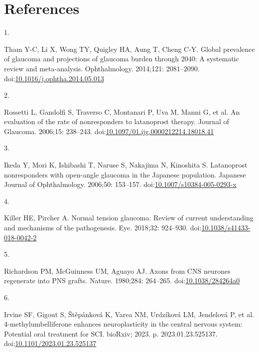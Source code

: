 \documentclass[
  12pt,
  a4paper,
]{book}
\newlength{\cslhangindent}
\newlength{\csllabelwidth}
\newlength{\cslentryspacingunit} %
\newenvironment{CSLReferences}[2] %
 {%
  \setlength{\parindent}{0pt}
  \ifodd #1
  \let\oldpar\par
  \def\par{\hangindent=\cslhangindent\oldpar}
  \fi
  \setlength{\parskip}{#2\cslentryspacingunit}
 }%
 {}
\newcommand{\CSLLeftMargin}[1]{\parbox[t]{\csllabelwidth}{#1}}
\newcommand{\CSLRightInline}[1]{\parbox[t]{\linewidth - \csllabelwidth}{#1}\break}
\begin{document}
\hypertarget{BIB}{%
\chapter*{References}\label{BIB}}


\hypertarget{refs}{}
\begin{CSLReferences}{0}{0}
\leavevmode{}%
\CSLLeftMargin{1. }%
\CSLRightInline{Tham Y-C, Li X, Wong TY, Quigley HA, Aung T, Cheng C-Y. Global prevalence of glaucoma and projections of glaucoma burden through 2040: A systematic review and meta-analysis. Ophthalmology. 2014;121: 2081--2090. doi:\href{https://doi.org/10.1016/j.ophtha.2014.05.013}{10.1016/j.ophtha.2014.05.013}}

\leavevmode{}%
\CSLLeftMargin{2. }%
\CSLRightInline{Rossetti L, Gandolfi S, Traverso C, Montanari P, Uva M, Manni G, et al. An evaluation of the rate of nonresponders to latanoprost therapy. Journal of Glaucoma. 2006;15: 238--243. doi:\href{https://doi.org/10.1097/01.ijg.0000212214.18018.41}{10.1097/01.ijg.0000212214.18018.41}}

\leavevmode{}%
\CSLLeftMargin{3. }%
\CSLRightInline{Ikeda Y, Mori K, Ishibashi T, Naruse S, Nakajima N, Kinoshita S. Latanoprost nonresponders with open-angle glaucoma in the {Japanese} population. Japanese Journal of Ophthalmology. 2006;50: 153--157. doi:\href{https://doi.org/10.1007/s10384-005-0293-x}{10.1007/s10384-005-0293-x}}

\leavevmode{}%
\CSLLeftMargin{4. }%
\CSLRightInline{Killer HE, Pircher A. Normal tension glaucoma: Review of current understanding and mechanisms of the pathogenesis. Eye. 2018;32: 924--930. doi:\href{https://doi.org/10.1038/s41433-018-0042-2}{10.1038/s41433-018-0042-2}}

\leavevmode{}%
\CSLLeftMargin{5. }%
\CSLRightInline{Richardson PM, McGuinness UM, Aguayo AJ. Axons from {CNS} neurones regenerate into {PNS} grafts. Nature. 1980;284: 264--265. doi:\href{https://doi.org/10.1038/284264a0}{10.1038/284264a0}}

\leavevmode{}%
\CSLLeftMargin{6. }%
\CSLRightInline{Irvine SF, Gigout S, Štěpánková K, Varea NM, Urdzíková LM, Jendelová P, et al. 4-methylumbelliferone enhances neuroplasticity in the central nervous system: Potential oral treatment for {SCI}. {bioRxiv}; 2023. p. 2023.01.23.525137. doi:\href{https://doi.org/10.1101/2023.01.23.525137}{10.1101/2023.01.23.525137}}


\end{CSLReferences}
\end{document}
